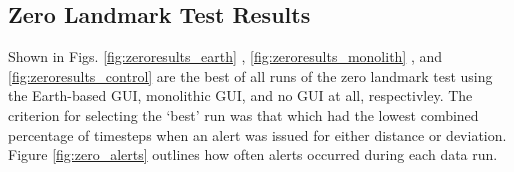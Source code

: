 \subsection{Zero Landmark Test Results} \label{sec:zerolandmarkresults}

Shown in Figs. \ref{fig:zeroresults_earth} , \ref{fig:zeroresults_monolith} , and \ref{fig:zeroresults_control} are the best of all runs of the zero landmark test using the Earth-based GUI, monolithic GUI, and no GUI at all, respectivley. The criterion for selecting the `best' run was that which had the lowest combined percentage of timesteps when an alert was issued for either distance or deviation. Figure \ref{fig:zero_alerts} outlines how often alerts occurred during each data run.

